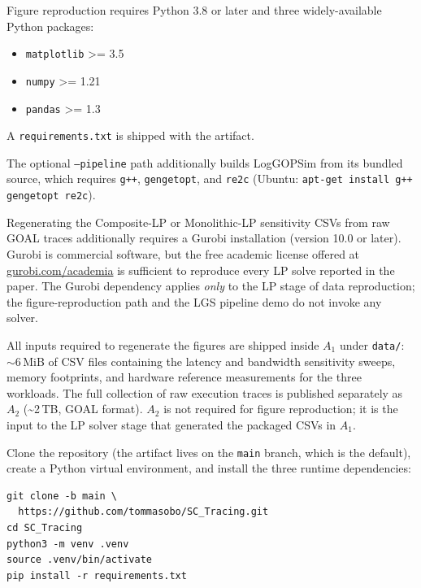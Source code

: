 \documentclass[conference]{IEEEtran}
\begin{document}

Figure reproduction requires Python 3.8 or later and three
widely-available Python packages:

\begin{itemize}
\item \texttt{matplotlib} \textgreater= 3.5
\item \texttt{numpy} \textgreater= 1.21
\item \texttt{pandas} \textgreater= 1.3
\end{itemize}

A \texttt{requirements.txt} is shipped with the artifact.

The optional \texttt{--pipeline} path additionally builds
LogGOPSim from its bundled source, which requires
\texttt{g++}, \texttt{gengetopt}, and \texttt{re2c} (Ubuntu:
\texttt{apt-get install g++ gengetopt re2c}).

Regenerating the Composite-LP or Monolithic-LP sensitivity CSVs
from raw GOAL traces additionally requires a Gurobi installation
(version 10.0 or later). Gurobi is commercial software, but the
free academic license offered at \url{gurobi.com/academia} is
sufficient to reproduce every LP solve reported in the paper.
The Gurobi dependency applies \emph{only} to the LP stage of
data reproduction; the figure-reproduction path and the LGS
pipeline demo do not invoke any solver.


All inputs required to regenerate the figures are shipped inside
$A_1$ under \texttt{data/}: ${\sim}6$\,MiB of CSV files containing the
latency and bandwidth sensitivity sweeps, memory footprints, and
hardware reference measurements for the three workloads.
The full collection of raw execution traces is published separately
as $A_2$ (\textasciitilde 2\,TB, GOAL format). $A_2$ is not required
for figure reproduction; it is the input to the LP solver stage that
generated the packaged CSVs in $A_1$.


Clone the repository (the artifact lives on the \texttt{main}
branch, which is the default), create a Python virtual environment,
and install the three runtime dependencies:

\begingroup\small
\begin{verbatim}
git clone -b main \
  https://github.com/tommasobo/SC_Tracing.git
cd SC_Tracing
python3 -m venv .venv
source .venv/bin/activate
pip install -r requirements.txt
\end{verbatim}
\endgroup
\end{document}
